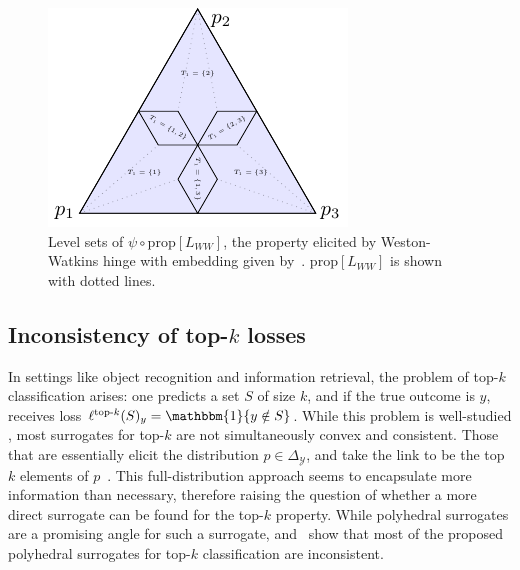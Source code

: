 \documentclass[11pt]{article}
\newcommand{\prop}[1]{\mathrm{prop}[#1]}
\newcommand{\simplex}{\Delta_\Y}
\newcommand{\Y}{\mathcal{Y}}
\newcommand{\ones}{\mathbbm{1}}
\newcommand{\elltopk}{\ell^{\text{top-$k$}}}
\begin{document}
\begin{figure}[H]
	\begin{minipage}{0.5\linewidth}
	\centering
	\includegraphics[width=0.9\linewidth]{tikz/ordered-partition}
	\end{minipage}
	\hfill
	\begin{minipage}{0.45\linewidth}
	\caption{Level sets of $\psi \circ \prop{L_{WW}}$, the property elicited by Weston-Watkins hinge with embedding given by~\citet[Definition 2.3]{wang2020weston}.  $\prop{L_{WW}}$ is shown with dotted lines.}
	\label{fig:ordered-partition}
	\end{minipage}
\end{figure}


\subsection{Inconsistency of top-$k$ losses}
\label{sec:top-k}
In settings like object recognition and information retrieval, the problem of top-$k$ classification arises: one predicts a set $S$ of size $k$, and if the true outcome is $y$, receives loss $\elltopk(S)_y = \ones\{y\notin S\}$.
While this problem is well-studied \citep{lapin2015top, lapin2016loss, lapin2018analysis,yang2018consistency,berrada2018smooth,rastegari2011scalable}, most surrogates for top-$k$ are not simultaneously convex and consistent.
Those that are essentially elicit the distribution $p \in \simplex$, and take the link to be the top $k$ elements of $p$~\citep{lapin2016loss}.
This full-distribution approach seems to encapsulate more information than necessary, therefore raising the question of whether a more direct surrogate can be found for the top-$k$ property.
While polyhedral surrogates are a promising angle for such a surrogate, \citet{lapin2016loss} and~\citet{yang2018consistency} show that most of the proposed polyhedral surrogates for top-$k$ classification are inconsistent.
\end{document}

